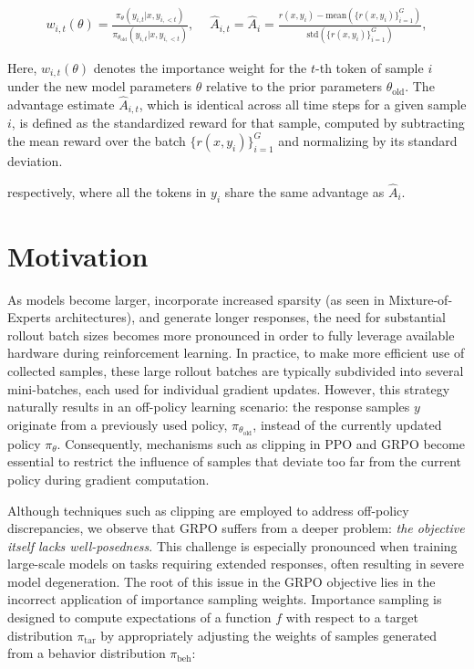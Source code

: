 \begin{align}
    w_{i,t}(\theta)=\frac{ \pi_{\theta} (y_{i,t} | x, y_{i,<t}) }{ \pi_{\theta_\text{old}} (y_{i,t} | x,y_{i,<t})},\quad\ 
    \widehat{A}_{i,t} = \widehat{A}_{i} = \frac{r(x, y_i) - \mathrm{mean} \left( \{ r(x, y_i) \}_{i=1}^G \right) }{ \mathrm{std} \left( \{ r(x, y_i) \}_{i=1}^G \right) },
\end{align}

Here, $w_{i,t}(\theta)$ denotes the importance weight for the $t$-th token of sample $i$ under the new model parameters $\theta$ relative to the prior parameters $\theta_\text{old}$. The advantage estimate $\widehat{A}_{i,t}$, which is identical across all time steps for a given sample $i$, is defined as the standardized reward for that sample, computed by subtracting the mean reward over the batch $\{ r(x, y_i) \}_{i=1}^G$ and normalizing by its standard deviation.

respectively, where all the tokens in $y_i$ share the same advantage as $\widehat{A}_{i}$.

\section{Motivation}
\label{sec:motivation}

As models become larger, incorporate increased sparsity (as seen in Mixture-of-Experts architectures), and generate longer responses, the need for substantial rollout batch sizes becomes more pronounced in order to fully leverage available hardware during reinforcement learning. In practice, to make more efficient use of collected samples, these large rollout batches are typically subdivided into several mini-batches, each used for individual gradient updates. However, this strategy naturally results in an off-policy learning scenario: the response samples $y$ originate from a previously used policy, $\pi_{\theta_\text{old}}$, instead of the currently updated policy $\pi_\theta$. Consequently, mechanisms such as clipping in PPO and GRPO become essential to restrict the influence of samples that deviate too far from the current policy during gradient computation.

Although techniques such as clipping are employed to address off-policy discrepancies, we observe that GRPO suffers from a deeper problem: \textit{the objective itself lacks well-posedness}. This challenge is especially pronounced when training large-scale models on tasks requiring extended responses, often resulting in severe model degeneration. The root of this issue in the GRPO objective lies in the incorrect application of importance sampling weights. Importance sampling is designed to compute expectations of a function $f$ with respect to a target distribution $\pi_\text{tar}$ by appropriately adjusting the weights of samples generated from a behavior distribution $\pi_\text{beh}$:

